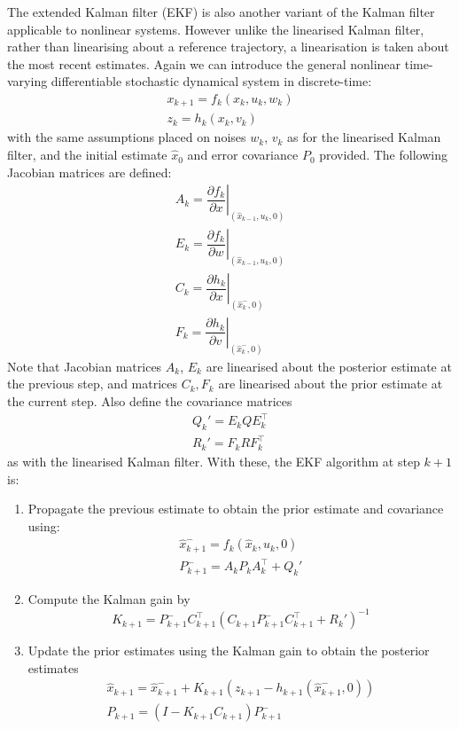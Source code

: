 \documentclass[11pt]{report} %
\begin{document}
The extended Kalman filter (EKF) is also another variant of the Kalman filter applicable to nonlinear systems. However unlike the linearised Kalman filter, rather than linearising about a reference trajectory, a linearisation is taken about the most recent estimates. Again we can introduce the general nonlinear time-varying differentiable stochastic dynamical system in discrete-time:
\begin{gather}
x_{k + 1} = f_{k}\left(x_{k}, u_{k}, w_{k}\right) \\
z_{k} = h_{k}\left(x_{k}, v_{k}\right)
\end{gather}
with the same assumptions placed on noises $w_{k}$, $v_{k}$ as for the linearised Kalman filter, and the initial estimate $\hat{x}_{0}$ and error covariance $P_{0}$ provided. The following Jacobian matrices are defined:
\begin{gather}
A_{k} = \left.\dfrac{\partial f_{k}}{\partial x}\right|_{\left(\hat{x}_{k - 1}, u_{k}, 0\right)} \\
E_{k} = \left.\dfrac{\partial f_{k}}{\partial w}\right|_{\left(\hat{x}_{k - 1}, u_{k}, 0\right)} \\
C_{k} = \left.\dfrac{\partial h_{k}}{\partial x}\right|_{\left(\hat{x}_{k}^{-},  0\right)} \\
F_{k} = \left.\dfrac{\partial h_{k}}{\partial v}\right|_{\left(\hat{x}_{k}^{-},  0\right)}
\end{gather}
Note that Jacobian matrices $A_{k}$, $E_{k}$ are linearised about the posterior estimate at the previous step, and matrices $C_{k}, F_{k}$ are linearised about the prior estimate at the current step. Also define the covariance matrices
\begin{gather}
Q_{k}' = E_{k}QE_{k}^{\top} \\
R_{k}' = F_{k}RF_{k}^{\top}
\end{gather}
as with the linearised Kalman filter. With these, the EKF algorithm at step $k + 1$ is:
\begin{enumerate}
\item Propagate the previous estimate to obtain the prior estimate and covariance using:
\begin{gather}
\hat{x}_{k + 1}^{-} = f_{k}\left(\hat{x}_{k}, u_{k}, 0\right) \\
P_{k + 1}^{-} = A_{k}P_{k}A_{k}^{\top} + Q_{k}'	
\end{gather}
\item Compute the Kalman gain by
\begin{equation}
K_{k + 1} = P_{k + 1}^{-}C_{k + 1}^{\top}\left(C_{k + 1}P_{k + 1}^{-}C_{k + 1}^{\top} + R_{k}'\right)^{-1}
\end{equation}
\item  Update the prior estimates using the Kalman gain to obtain the posterior estimates
\begin{gather}
\hat{x}_{k + 1} = \hat{x}_{k + 1}^{-} + K_{k + 1}\left(z_{k + 1} - h_{k + 1}\left(\hat{x}_{k + 1}^{-}, 0\right)\right) \\
P_{k + 1} = \left(I - K_{k + 1}C_{k + 1}\right)P_{k + 1}^{-}
\end{gather}
\end{enumerate}
\end{document}
